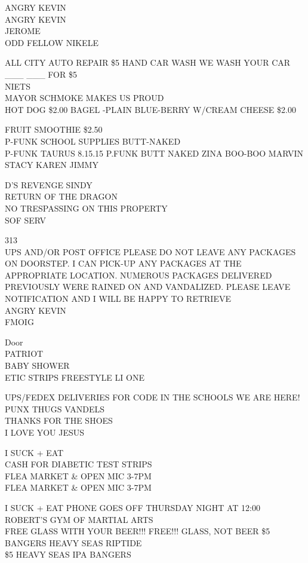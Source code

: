 \documentclass[10pt,letterpaper]{article}
\begin{document}
ANGRY KEVIN\\
ANGRY KEVIN\\
JEROME\\
ODD FELLOW NIKELE

ALL CITY AUTO REPAIR \$5 HAND CAR WASH WE WASH YOUR CAR \_\_\_ \_\_\_ FOR \$5\\
NIETS\\
MAYOR SCHMOKE MAKES US PROUD\\
HOT DOG \$2.00 BAGEL {-}PLAIN BLUE{-}BERRY W/CREAM CHEESE \$2.00

FRUIT SMOOTHIE \$2.50\\
P{-}FUNK SCHOOL SUPPLIES BUTT{-}NAKED\\
P{-}FUNK TAURUS 8.15.15 P.FUNK BUTT NAKED ZINA BOO{-}BOO MARVIN\\
STACY KAREN JIMMY

D'S REVENGE SINDY\\
RETURN OF THE DRAGON\\
NO TRESPASSING ON THIS PROPERTY\\
SOF SERV

313\\
UPS AND/OR POST OFFICE PLEASE DO NOT LEAVE ANY PACKAGES ON DOORSTEP.  I CAN PICK{-}UP ANY PACKAGES AT THE APPROPRIATE LOCATION.  NUMEROUS PACKAGES DELIVERED PREVIOUSLY WERE RAINED ON AND VANDALIZED.  PLEASE LEAVE NOTIFICATION AND I WILL BE HAPPY TO RETRIEVE\\
ANGRY KEVIN\\
FMOIG

Door\\
PATRIOT\\
BABY SHOWER\\
ETIC STRIPS FREESTYLE LI ONE

UPS/FEDEX DELIVERIES FOR CODE IN THE SCHOOLS WE ARE HERE!\\
PUNX THUGS VANDELS\\
THANKS FOR THE SHOES\\
I LOVE YOU JESUS

I SUCK + EAT\\
CASH FOR DIABETIC TEST STRIPS\\
FLEA MARKET \& OPEN MIC 3{-}7PM\\
FLEA MARKET \& OPEN MIC 3{-}7PM

I SUCK + EAT PHONE GOES OFF THURSDAY NIGHT AT 12:00\\
ROBERT'S GYM OF MARTIAL ARTS\\
FREE GLASS WITH YOUR BEER!!! FREE!!! GLASS, NOT BEER \$5 BANGERS HEAVY SEAS RIPTIDE\\
\$5 HEAVY SEAS IPA BANGERS
\end{document}
